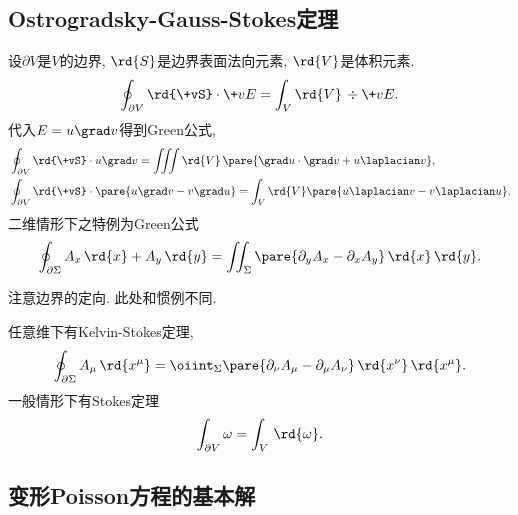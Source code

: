 \documentclass[hidelinks]{ctexart}
\begin{document}

\subsection{Ostrogradsky-Gauss-Stokes定理} %
\label{sub:ostrogradsky_gauss_stokes定理}

\newpoint{}设$\partial V$是$V$的边界, $\rd{S}$是边界表面法向元素, $\rd{V}$是体积元素.
\[ \oint_{\partial V} \rd{\+vS}\cdot \+vE = \int_V \rd{V}\, \div \+vE. \]
\newpoint{}代入$E = u\grad v$得到Green公式,
\begin{align*}
    &\oint_{\partial V}\rd{\+vS}\cdot u\grad v = \iiint \rd{V}\,\pare{\grad u \cdot \grad v + u \laplacian v}, \\
    &\oint_{\partial V}\rd{\+vS}\cdot \pare{u\grad v-v\grad u} = \int_V \rd{V}\pare{u\laplacian v - v\laplacian u}.
\end{align*}
\newpoint{}二维情形下之特例为Green公式
\[ \oint_{\partial \Sigma} A_x\,\rd{x} + A_y\,\rd{y} = \iint_{\Sigma}\pare{\partial_y A_x - \partial_x A_y}\,\rd{x}\,\rd{y}. \]
\begin{pitfall}
    注意边界的定向. 此处和惯例不同.
\end{pitfall}
\newpoint{}任意维下有Kelvin-Stokes定理,
\[ \oint_{\partial \Sigma} A_\mu\,\rd{x^\mu} = \oiint_\Sigma\pare{\partial_\nu A_\mu - \partial_\mu A_\nu}\,\rd{x^\nu}\,\rd{x^\mu}. \]
\newpoint{}一般情形下有Stokes定理
\[ \int_{\partial V} \omega = \int_V \,\rd{\omega}. \]


\subsection{变形Poisson方程的基本解} %
\label{sub:变形poisson方程的基本解}
\end{document}
